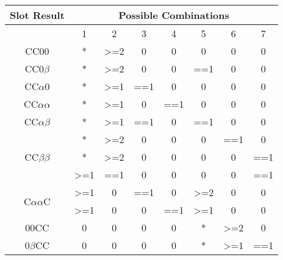 \documentclass[fleqn]{article}
\begin{document}
\begin{table}[]
\centering
\begin{tabular}{|c|c|c|c|c|c|c|c|}

\hline
Slot Result                         & \multicolumn{7}{c|}{Possible Combinations}                                                  \\ \hline
                                    & 1                & 2                & 3   & 4   & 5                & 6                & 7   \\ \hline
CC00                                & *                & \textgreater{}=2 & 0   & 0   & 0                & 0                & 0   \\ \hline
CC0$\beta$                          & *                & \textgreater{}=2 & 0   & 0   & ==1              & 0                & 0   \\ \hline
CC$\alpha$0                         & *                & \textgreater{}=1 & ==1 & 0   & 0                & 0                & 0   \\ \hline
CC$\alpha$$\alpha$                  & *                & \textgreater{}=1 & 0   & ==1 & 0                & 0                & 0   \\ \hline
CC$\alpha$$\beta$                   & *                & \textgreater{}=1 & ==1 & 0   & ==1              & 0                & 0   \\ \hline
\multirow{3}{*}{CC$\beta$$\beta$}   & *                & \textgreater{}=2 & 0   & 0   & 0                & ==1              & 0   \\ \cline{2-8} 
                                    & *                & \textgreater{}=2 & 0   & 0   & 0                & 0                & ==1 \\ \cline{2-8} 
                                    & \textgreater{}=1 & ==1              & 0   & 0   & 0                & 0                & ==1 \\ \hline
\multirow{2}{*}{C$\alpha$$\alpha$C} & \textgreater{}=1 & 0                & ==1 & 0   & \textgreater{}=2 & 0                & 0   \\ \cline{2-8} 
                                    & \textgreater{}=1 & 0                & 0   & ==1 & \textgreater{}=1 & 0                & 0   \\ \hline
00CC                                & 0                & 0                & 0   & 0   & *                & \textgreater{}=2 & 0   \\ \hline
0$\beta$CC                          & 0                & 0                & 0   & 0   & *                & \textgreater{}=1 & ==1 \\ \hline

\end{tabular}
\end{table}
\end{document}

